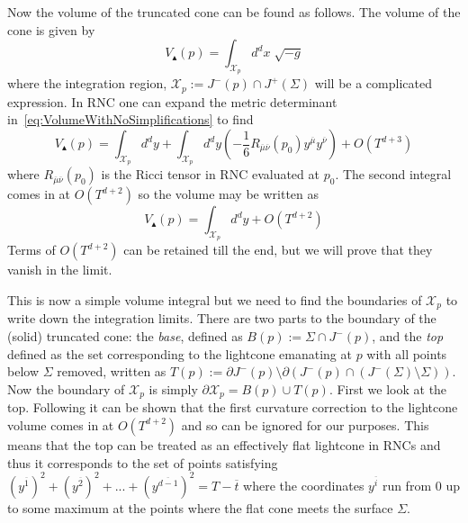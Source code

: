 \documentclass[12pt]{article}
\newcommand{\be}{\begin{equation}}
\newcommand{\ee}{\end{equation}}
\begin{document}
Now the volume of the truncated cone can be found as follows. 
The volume of the cone is given by
\be\label{eq:VolumeWithNoSimplifications}
V_\blacktriangle (p)=\int_{\mathcal{X}_p} d^d x\;\sqrt{-g}
\ee
where the integration region, $\mathcal{X}_p:= J^- (p)\cap J^+ (\Sigma)$ will be a complicated expression. In RNC one can expand the metric determinant in~\eqref{eq:VolumeWithNoSimplifications} to find
\be\label{eq:VolumeWithRNC}
V_\blacktriangle (p) =\int_{\mathcal{X}_p}d^dy+\int_{\mathcal{X}_p}d^dy\left (-\frac{1}{6}R_{\overline{\mu}\overline{\nu}} (p_0)y^{\overline{\mu}}y^{\overline{\nu}} \right)+O (T^{d+3})
\ee
where $R_{\overline{\mu}\overline{\nu}} (p_0)$ is the Ricci tensor in RNC evaluated at $p_0$. The second integral comes in at $O (T^{d+2})$ so the volume may be written as
\be\label{eq:VolumeToLowestOrder}
V_\blacktriangle (p) =\int_{\mathcal{X}_p}d^dy+O (T^{d+2})
\ee
Terms of $O (T^{d+2})$ can be retained till the end, but we will prove that they vanish in the limit.

This is now a simple volume integral but we need to find the boundaries of $\mathcal{X}_p$ to write down the integration limits. There are two parts to the boundary of the (solid) truncated cone: the \emph{base}, defined as $B(p):=\Sigma\cap J^-(p)$, and the \emph{top} defined as the set corresponding to the lightcone emanating at $p$ with all points below $\Sigma$ removed, written as $T(p):=\partial J^-(p)\setminus\partial(J^-(p)\cap (J^-(\Sigma)\setminus\Sigma))$. Now the boundary of $\mathcal{X}_p$ is simply $\partial\mathcal{X}_p=B(p)\cup T(p)$. First we look at the top. Following \cite{Khetrapal_Sumati:Causal_Diamond_Volume} it can be shown that the first curvature correction to the lightcone volume comes in at $O (T^{d+2})$ and so can be ignored for our purposes. This means that the top can be treated as an effectively flat lightcone in RNCs and thus it corresponds to the set of points satisfying $ (y^{\overline{1}})^2+ (y^{\overline{2}})^2+...+ (y^{\overline{d-1}})^2= T-\overline{t}$ where the coordinates  $y^{\overline{i}}$ run from $0$ up to some maximum at the points where the flat cone meets the surface $\Sigma$.
\end{document}

